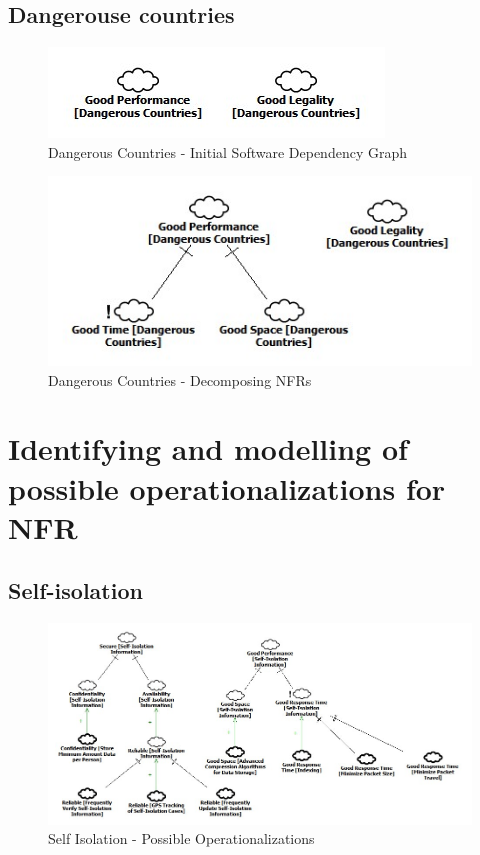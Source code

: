\documentclass{VUMIFPSkursinis}
\begin{document}
\begin{landscape}
	\subsection{Dangerouse countries}
		\begin{figure}[H]
			\center
			\includegraphics[scale=0.9]{StarUML/Dangerous-Countries-1}
			\caption{Dangerous Countries - Initial Software Dependency Graph} %
			\label{img:kurimoProcesas}
		\end{figure}
		\begin{figure}[H]
			\center
			\includegraphics[scale=0.9]{StarUML/Dangerous-Countries-2}
			\caption{Dangerous Countries - Decomposing NFRs} %
			\label{img:kurimoProcesas}
		\end{figure}	

\section{Identifying and modelling of possible operationalizations for NFR}
	\subsection{Self-isolation}
			\begin{figure}[H]
				\center
				\includegraphics[scale=0.6]{StarUML/Self-Isolation-3}
				\caption{Self Isolation - Possible Operationalizations} %
				\label{img:kurimoProcesas}
			\end{figure}
		

\end{landscape}
\end{document}
